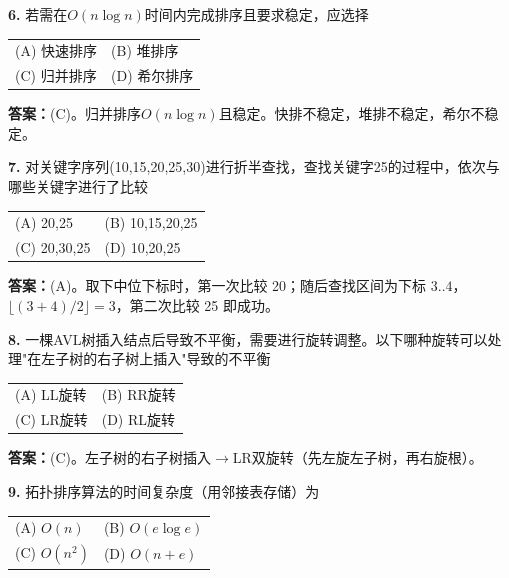 \vspace{6pt}

\noindent\textbf{6.} 若需在$O(n\log n)$时间内完成排序且要求稳定，应选择
\begin{center}
\begin{tabular}{ll}
(A) 快速排序 & (B) 堆排序 \\[6pt]
(C) 归并排序 & (D) 希尔排序
\end{tabular}
\end{center}

\ifshowsolutions\par\noindent\textbf{答案：}(C)。归并排序$O(n\log n)$且稳定。快排不稳定，堆排不稳定，希尔不稳定。\else \answerarea \fi

\vspace{6pt}

\noindent\textbf{7.} 对关键字序列(10,15,20,25,30)进行折半查找，查找关键字25的过程中，依次与哪些关键字进行了比较
\begin{center}
\begin{tabular}{ll}
(A) 20,25 & (B) 10,15,20,25 \\[6pt]
(C) 20,30,25 & (D) 10,20,25
\end{tabular}
\end{center}

\ifshowsolutions\par\noindent\textbf{答案：}(A)。取下中位下标时，第一次比较 20；随后查找区间为下标 $3..4$，$\lfloor(3+4)/2\rfloor=3$，第二次比较 25 即成功。\else \answerarea \fi

\vspace{6pt}

\noindent\textbf{8.} 一棵AVL树插入结点后导致不平衡，需要进行旋转调整。以下哪种旋转可以处理"在左子树的右子树上插入"导致的不平衡
\begin{center}
\begin{tabular}{ll}
(A) LL旋转 & (B) RR旋转 \\[6pt]
(C) LR旋转 & (D) RL旋转
\end{tabular}
\end{center}

\ifshowsolutions\par\noindent\textbf{答案：}(C)。左子树的右子树插入$\to$LR双旋转（先左旋左子树，再右旋根）。\else \answerarea \fi

\vspace{6pt}

\noindent\textbf{9.} 拓扑排序算法的时间复杂度（用邻接表存储）为
\begin{center}
\begin{tabular}{ll}
(A) $O(n)$ & (B) $O(e\log e)$ \\[6pt]
(C) $O(n^2)$ & (D) $O(n+e)$
\end{tabular}
\end{center}

